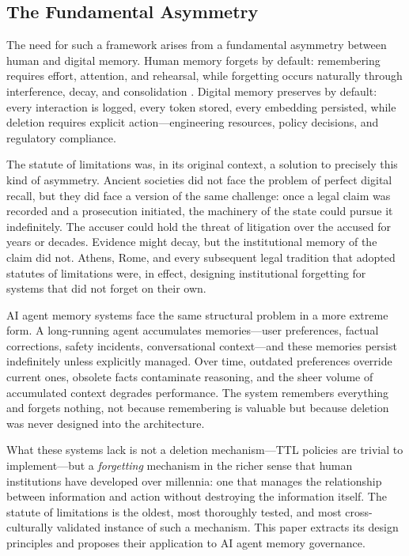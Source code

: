 \documentclass[12pt]{article}
\begin{document}
\subsection{The Fundamental Asymmetry}
\label{sec:fundamental-asymmetry}

The need for such a framework arises from a fundamental asymmetry between human and digital memory. Human memory forgets by default: remembering requires effort, attention, and rehearsal, while forgetting occurs naturally through interference, decay, and consolidation \citep{ricoeur-memory}. Digital memory preserves by default: every interaction is logged, every token stored, every embedding persisted, while deletion requires explicit action---engineering resources, policy decisions, and regulatory compliance.

The statute of limitations was, in its original context, a solution to precisely this kind of asymmetry. Ancient societies did not face the problem of perfect digital recall, but they did face a version of the same challenge: once a legal claim was recorded and a prosecution initiated, the machinery of the state could pursue it indefinitely. The accuser could hold the threat of litigation over the accused for years or decades. Evidence might decay, but the institutional memory of the claim did not. Athens, Rome, and every subsequent legal tradition that adopted statutes of limitations were, in effect, designing institutional forgetting for systems that did not forget on their own.

AI agent memory systems face the same structural problem in a more extreme form. A long-running agent accumulates memories---user preferences, factual corrections, safety incidents, conversational context---and these memories persist indefinitely unless explicitly managed. Over time, outdated preferences override current ones, obsolete facts contaminate reasoning, and the sheer volume of accumulated context degrades performance. The system remembers everything and forgets nothing, not because remembering is valuable but because deletion was never designed into the architecture.

What these systems lack is not a deletion mechanism---TTL policies are trivial to implement---but a \emph{forgetting} mechanism in the richer sense that human institutions have developed over millennia: one that manages the relationship between information and action without destroying the information itself. The statute of limitations is the oldest, most thoroughly tested, and most cross-culturally validated instance of such a mechanism. This paper extracts its design principles and proposes their application to AI agent memory governance.
\end{document}

